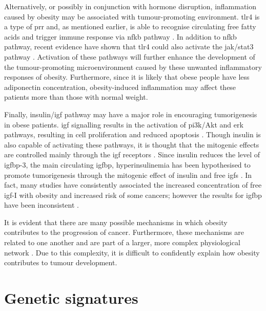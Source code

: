 Alternatively, or possibly in conjunction with hormone disruption, inflammation caused by obesity may be associated with tumour-promoting environment.
\Gls{tlr}4 is a type of \gls{prr} and, as mentioned earlier, is able to recognise circulating free fatty acids and trigger immune response via \gls{nfkb} pathway \citep{Lumeng2011}.
In addition to \gls{nfkb} pathway, recent evidence have shown that \gls{tlr}4 could also activate the \gls{jak}/\gls{stat3} pathway \citep{Yu2014}.
Activation of these pathways will further enhance the development of the tumour-promoting microenvironment caused by these unwanted inflammatory responses of obesity.
Furthermore, since it is likely that obese people have less adiponectin concentration, obesity-induced inflammation may affect these patients more than those with normal weight.

Finally, insulin/\gls{igf} pathway may have a major role in encouraging tumorigenesis in obese patients.
\gls{igf} signalling results in the activation of \gls{pi3k}/Akt and \gls{erk} pathways, resulting in cell proliferation and reduced apoptosis \citep{Roberts2010}.
Though insulin is also capable of activating these pathways, it is thought that the mitogenic effects are controlled mainly through the \gls{igf} receptors \citep{Roberts2010}.
Since insulin reduces the level of \gls{igfbp}-3, the main circulating \gls{igfbp}, hyperinsulinemia has been hypothesised to promote tumorigenesis through the mitogenic effect of insulin and free \glspl{igf} \citep{Giovannucci1995,Mckeown1994,Roberts2010}.
In fact, many studies have consistently associated the increased concentration of free \gls{igf}-I with obesity and increased risk of some cancers; however the results for \gls{igfbp} have been inconsistent \citep{Basen2011}.

It is evident that there are many possible mechanisms in which obesity contributes to the progression of cancer.
Furthermore, these mechanisms are related to one another and are part of a larger, more complex physiological network \citep{Renehan2006}.
Due to this complexity, it is difficult to confidently explain how obesity contributes to tumour development.

\section{Genetic signatures}
\label{sec:genetic_signatures}

